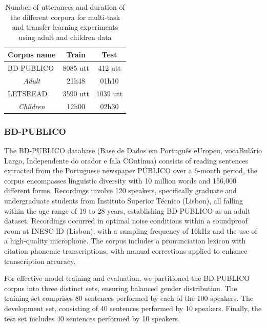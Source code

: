 \begin{table}[h]
\begin{center}
\begin{tabular}{lcc}
\hline
Corpus name      & Train & Test  \\ \hline
\multicolumn{1}{l}{BD-PUBLICO}             & 8085 utt  & 412 utt  \\ 
\multicolumn{1}{c}{\textit{Adult}}              & 21h48 & 01h10 \\\hline
\multicolumn{1}{l}{LETSREAD}     & 3590 utt & 1039 utt \\ 
\multicolumn{1}{c}{\textit{Children}}     & 12h00 & 02h30 \\  \hline
\end{tabular}
\caption{Number of utterances and duration of the different corpora for multi-task and transfer learning experiments using adult and children data}
\label{tab:statistics_exp1}
\end{center}
\end{table}

\subsubsection*{BD-PUBLICO}
The BD-PUBLICO database (Base de Dados em Português eUropeu, vocaBulário Largo, Independente do orador e fala COntínua) \cite{bdpublico} consists of reading sentences extracted from the Portuguese newspaper PÚBLICO over a 6-month period, the corpus encompasses linguistic diversity with 10 million words and 156,000 different forms. Recordings involve 120 speakers, specifically graduate and undergraduate students from Instituto Superior Técnico (Lisbon), all falling within the age range of 19 to 28 years, establishing BD-PUBLICO as an adult dataset. Recordings occurred in optimal noise conditions within a soundproof room at INESC-ID (Lisbon), with a sampling frequency of 16kHz and the use of a high-quality microphone. The corpus includes a pronunciation lexicon with citation phonemic transcriptions, with manual corrections applied to enhance transcription accuracy.

For effective model training and evaluation, we partitioned the BD-PUBLICO corpus into three distinct sets, ensuring balanced gender distribution. The training set comprises 80 sentences performed by each of the 100 speakers. The development set, consisting of 40 sentences performed by 10 speakers. Finally, the test set includes 40 sentences performed by 10 speakers.


